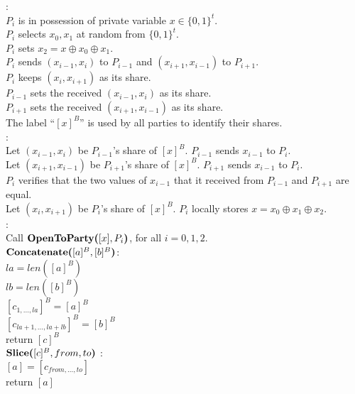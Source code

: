 \begin{protocol}
	: \\
	\indent $P_i$ is in possession of private variable $x \in \{0, 1\}^t$. \\
	\indent $P_i$ selects $x_0, x_1$ at random from $\{0, 1\}^t$. \\
	\indent $P_i$ sets $x_2 = x \oplus x_0 \oplus x_1$.\\
	\indent $P_i$ sends $(x_{i-1}, x_i)$ to $P_{i-1}$ and
			$(x_{i+1}, x_{i-1})$ to $P_{i+1}$. \\
	\indent $P_i$ keeps $(x_i, x_{i+1})$ as its share.\\
	\indent $P_{i-1}$ sets the received $(x_{i-1}, x_i)$ as its share.\\
	\indent $P_{i+1}$ sets the received $(x_{i+1}, x_{i-1})$ as its share.\\
	\indent The label ``$[x]^B$'' is used by all parties to identify their shares. \\

	\noindent {}: \\
	\indent Let $(x_{i-1}, x_i)$ be $P_{i-1}$'s share of $[x]^B$.
		$P_{i-1}$ sends $x_{i-1}$ to $P_i$.\\
	\indent Let $(x_{i+1}, x_{i-1})$ be $P_{i+1}$'s share of $[x]^B$.
		$P_{i+1}$ sends $x_{i-1}$ to $P_i$.\\
	\indent $P_i$ verifies that the two values of $x_{i-1}$ that it received
		from $P_{i-1}$ and $P_{i+1}$ are equal. \\
	\indent Let $(x_i, x_{i+1})$ be $P_i$'s share of $[x]^B$. 
		$P_i$ locally stores $x = x_0 \oplus x_1 \oplus x_2$. \\

	\noindent \OutputToAll{[x]}: \\
	\indent Call $\textbf{OpenToParty(}[x], P_i\textbf{)}$, for all $i = 0,1,2$.\\

	\noindent $\textbf{Concatenate(}[a]^B, [b]^B\textbf{)}$: \\
	\indent $la = len([a]^B)$\\
	\indent $lb = len([b]^B)$\\
	\indent $[c_{1, \ldots, la}]^B = [a]^B$\\
	\indent $[c_{la+1, \ldots, la + lb}]^B = [b]^B$\\
	\indent return $[c]^B$ \\

	\noindent $\textbf{Slice(}[c]^B, from, to\textbf{)}$ : \\
	\indent $[a] = [c_{from, \ldots, to}]$\\
	\indent return $[a]$\\
\end{protocol}


